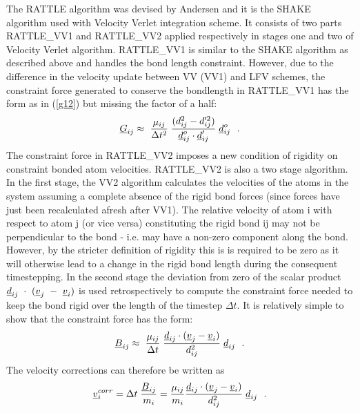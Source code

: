 The RATTLE algorithm  was devised by
Andersen \cite{andersen-83a} and it is the SHAKE algorithm used with
Velocity Verlet integration scheme.  It
consists of two parts RATTLE\_VV1 and RATTLE\_VV2 applied
respectively in stages one and two of Velocity
Verlet algorithm.  RATTLE\_VV1 is similar to
the SHAKE algorithm as described above and handles the bond length
constraint.  However, due to the difference in the velocity update
between VV (VV1) and LFV schemes, the constraint force generated to
conserve the bondlength in RATTLE\_VV1 has the form as in
(\ref{g12}) but missing the factor of a half:
\begin{equation}
\mbox{$\underline{G}$}_{ij} \approx\ {\mu_{ij} \over \Delta t^{2}} \;
{(d_{ij}^{2} - d_{ij}'^{2}) \over \mbox{$\underline{d}$}_{ij}^{o} \cdot
\mbox{$\underline{d}$}_{ij}'} \; \mbox{$\underline{d}$}_{ij}^{o}~~. \label{g121}
\end{equation}
The constraint force in RATTLE\_VV2 imposes a new condition of
rigidity on constraint bonded atom velocities.  RATTLE\_VV2 is
also a two stage algorithm.  In the first stage, the VV2 algorithm
calculates the velocities of the atoms in the system assuming a
complete absence of the rigid bond
forces (since forces have just been recalculated afresh after VV1).
The relative velocity of atom {i} with respect to atom {j}
(or vice versa) constituting the rigid bond {ij} may not be
perpendicular to the bond -  i.e. may have a non-zero component
along the bond. However, by the stricter definition of rigidity
this is is required to be zero as it will otherwise lead to a
change in the rigid bond length during the consequent timestepping.
In the second stage the deviation from zero of the scalar product
$\mbox{$\underline{d}$}_{ij}~\cdot~(\mbox{$\underline{v}$}_{j}~-~\mbox{$\underline{v}$}_{i})$ is used
retrospectively to compute the constraint force needed to keep the
bond rigid over the length of the timestep $\Delta t$.  It is
relatively simple to show that the constraint force has the form:
\begin{equation}
\mbox{$\underline{B}$}_{ij} \approx\ {\mu_{ij} \over \Delta t} \;
{\mbox{$\underline{d}$}_{ij} \cdot (\mbox{$\underline{v}$}_{j}-\mbox{$\underline{v}$}_{i}) \over
d_{ij}^{2}} \; \mbox{$\underline{d}$}_{ij}~~. \label{b12}
\end{equation}
The velocity corrections can therefore be written as
\begin{equation}
\mbox{$\underline{v}$}^{corr}_{i} = \Delta t \; {\mbox{$\underline{B}$}_{ij} \over m_{i}} =
{\mu_{ij} \over m_{i}} {\mbox{$\underline{d}$}_{ij} \cdot (\mbox{$\underline{v}$}_{j}-\mbox{$\underline{v}$}_{i}) \over
d_{ij}^{2}} \; \mbox{$\underline{d}$}_{ij}~~.
\end{equation}

